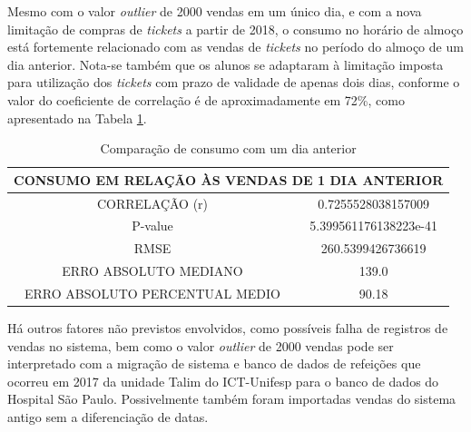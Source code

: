         \begin{figure}[h]
                    \end{figure}
	        
        Mesmo com o valor \textit{outlier} de 2000 vendas em um único dia, e com a nova limitação de compras de \textit{tickets} a partir de 2018, o consumo no horário de almoço está fortemente relacionado com as vendas de \textit{tickets} no período do almoço de um dia anterior. Nota-se também que os alunos se adaptaram à limitação imposta para utilização dos \textit{tickets} com prazo de validade de apenas dois dias, conforme o valor do coeficiente de correlação é de aproximadamente em 72\%, como apresentado na Tabela \ref{table:case1_vendas1}.
        
 \begin{table}[!htpb]
           \centering
           \caption{Comparação de consumo com um dia anterior}
             \begin{tabular}{c|c}\hline
                \multicolumn{2}{c}{CONSUMO EM RELAÇÃO ÀS VENDAS DE 1 DIA ANTERIOR}\\ \hline
                CORRELAÇÃO (r) &  0.7255528038157009\\
                P-value &5.399561176138223e-41\\
                RMSE & 260.5399426736619\\
                ERRO ABSOLUTO MEDIANO & 139.0\\
                ERRO ABSOLUTO PERCENTUAL MEDIO & 90.18\\\hline
            \end{tabular} \label{table:case1_vendas1} \end{table}
    	            

        
        Há outros fatores não previstos envolvidos, como possíveis falha de registros de vendas no sistema, bem como o valor \textit{outlier} de 2000 vendas pode ser interpretado com a migração de sistema e banco de dados de refeições que ocorreu em 2017 da unidade Talim do ICT-Unifesp para o banco de dados do Hospital São Paulo. Possivelmente também foram importadas vendas do sistema antigo sem a diferenciação de datas.
        
